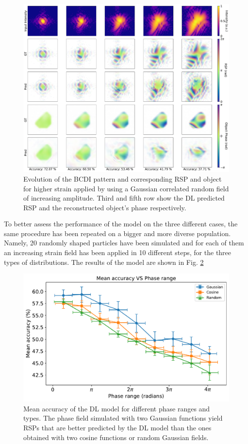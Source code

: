 \begin{figure}[H]
    \centering
    \includegraphics[width=\textwidth]{figures/Phasing/performance_random.pdf}
    \caption{Evolution of the BCDI pattern and corresponding RSP and object for higher strain applied by using a Gaussian
    correlated random field of increasing amplitude. Third and fifth row show the DL predicted RSP and the reconstructed 
    object's phase respectively. }
    \label{fig:random1}
\end{figure}

To better assess the performance of the model on the three different cases, the same procedure has been repeated on a 
bigger and more diverse population. Namely, 20 randomly shaped particles have been simulated and for each of them an 
increasing strain field has been applied in 10 different steps, for the three types of distributions. The results of 
the model are shown in Fig. \ref{fig:compa_all}

\begin{figure}[H]
    \centering
    \includegraphics[width=\textwidth]{figures/Phasing/plot_acc_comp_allFINAL.pdf}
    \caption{Mean accuracy of the DL model for different phase ranges and types. The phase field simulated with two Gaussian 
    functions yield RSPs that are better predicted by the DL model than the ones obtained with two cosine functions or 
    random Gaussian fields. }
    \label{fig:compa_all}
\end{figure}


